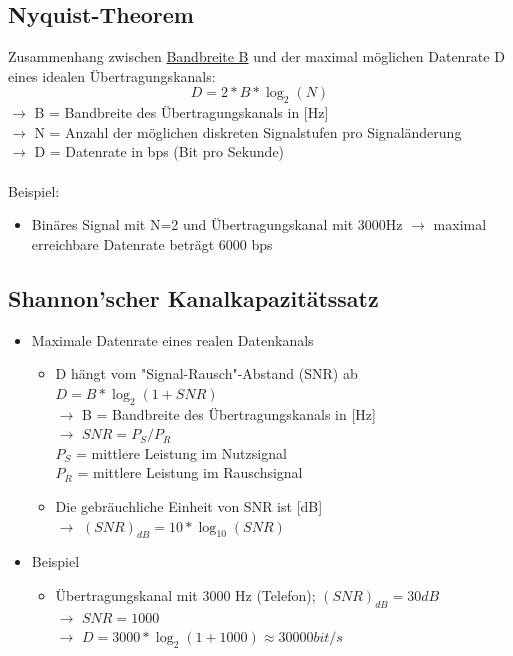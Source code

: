\documentclass{scrreprt}
\begin{document}
\subsection*{Nyquist-Theorem}
Zusammenhang zwischen \hyperref[sec:bandbreite]{Bandbreite B} und der maximal möglichen
Datenrate D eines idealen Übertragungskanals:
$$D = 2*B*\log_{2}(N)$$
$\rightarrow$ B = Bandbreite des Übertragungskanals in [Hz]
\\
$\rightarrow$ N = Anzahl der möglichen diskreten Signalstufen pro Signaländerung
\\
$\rightarrow$ D = Datenrate in bps (Bit pro Sekunde)
\\\\
Beispiel:
\begin{itemize}
	\item Binäres Signal mit N=2 und Übertragungskanal mit 3000Hz
	      $\rightarrow$ maximal erreichbare Datenrate beträgt 6000 bps
\end{itemize}

\subsection*{Shannon'scher Kanalkapazitätssatz}
\begin{itemize}
	\item Maximale Datenrate eines realen Datenkanals
	      \begin{itemize}
		      \item D hängt vom "Signal-Rausch"-Abstand (SNR) ab
		            \\$D=B*\log_{2}(1+SNR)$
			            \\$\rightarrow$ B = Bandbreite des Übertragungskanals in [Hz]
		            \\$\rightarrow$ $SNR = P_{S}/P_{R}$
			            \\$P_{S}$ = mittlere Leistung im Nutzsignal
		            \\$P_{R}$ = mittlere Leistung im Rauschsignal
		      \item Die gebräuchliche Einheit von SNR ist [dB]
		            \\$\rightarrow$ $(SNR)_{dB} = 10*\log_{10}(SNR)$
	      \end{itemize}
	\item Beispiel
	      \begin{itemize}
		      \item Übertragungskanal mit 3000 Hz (Telefon); $(SNR)_{dB} = 30dB$
		            \\$\rightarrow$ $SNR = 1000$
			            \\$\rightarrow$ $D = 3000*\log_{2}(1+1000) \approx 30000bit/s$
	      \end{itemize}
\end{itemize}
\end{document}
